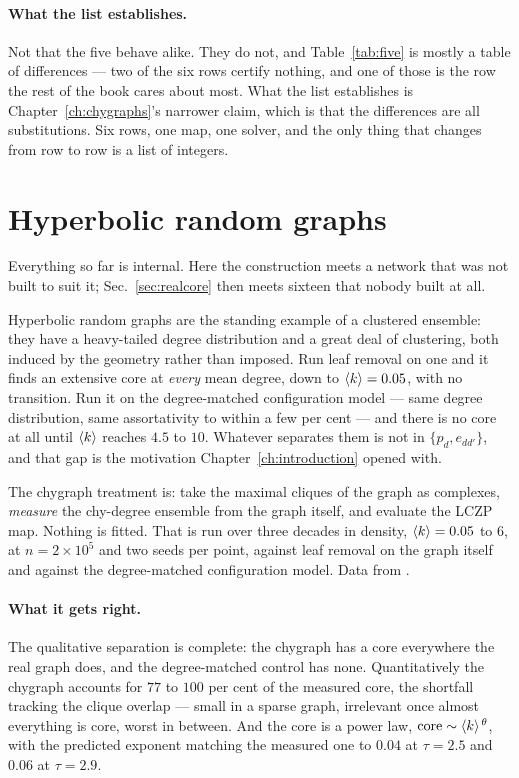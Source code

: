 \paragraph{What the list establishes.} Not that the five behave alike. They do
not, and Table~\ref{tab:five} is mostly a table of differences --- two of the
six rows certify nothing, and one of those is the row the rest of the book
cares about most. What the list establishes is
Chapter~\ref{ch:chygraphs}'s narrower claim, which is that the differences are
all substitutions. Six rows, one map, one solver, and the only thing that
changes from row to row is a list of integers.

\section{Hyperbolic random graphs}
\label{sec:hrg}

Everything so far is internal. Here the construction meets a network that was
not built to suit it; Sec.~\ref{sec:realcore} then meets sixteen that nobody
built at all.

Hyperbolic random graphs are the standing example of a clustered ensemble: they
have a heavy-tailed degree distribution and a great deal of clustering, both
induced by the geometry rather than imposed. Run leaf removal on one and it
finds an extensive core at \emph{every} mean degree, down to $\langle k \rangle=0.05$,
with no transition. Run it on the degree-matched configuration model --- same
degree distribution, same assortativity to within a few per cent --- and there is
no core at all until $\langle k \rangle$ reaches $4.5$ to $10$. Whatever separates them is
not in $\{p_{d},e_{dd'}\}$, and that gap is the motivation
Chapter~\ref{ch:introduction} opened with.

The chygraph treatment is: take the maximal cliques of the graph as complexes,
\emph{measure} the chy-degree ensemble from the graph itself, and evaluate
the LCZP map. Nothing is fitted. That is run over three decades in density,
$\langle k \rangle=0.05$ to $6$, at $n=2\times10^{5}$ and two seeds per point, against
leaf removal on the graph itself and against the degree-matched configuration
model. Data from
.

\paragraph{What it gets right.} The qualitative separation is complete: the
chygraph has a core everywhere the real graph does, and the degree-matched
control has none. Quantitatively the chygraph accounts for $77$ to $100$ per
cent of the measured core, the shortfall tracking the clique overlap --- small
in a sparse graph, irrelevant once almost everything is core, worst in between.
And the core is a power law, $\mathrm{core}\sim\langle k \rangle^{\,\theta}$, with the
predicted exponent matching the measured one to $0.04$ at $\tau=2.5$ and $0.06$
at $\tau=2.9$.

